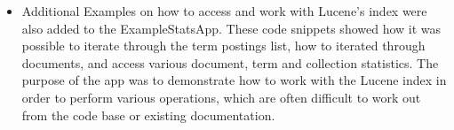 \begin{itemize}
	\item Additional Examples on how to access and work with Lucene's index were also added to the  ExampleStatsApp. These code snippets showed how it was possible to iterate through the term postings list, how to iterated through documents, and access various document, term and collection statistics. The purpose of the app was to demonstrate how to work with the Lucene index in order to perform various operations, which are often difficult to work out from the code base or existing documentation.
\end{itemize}
